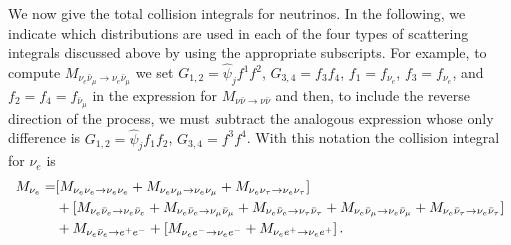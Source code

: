 We now give the total collision integrals for neutrinos.    In the following, we indicate which distributions are used in each of the four types of scattering integrals discussed above by using the appropriate subscripts. For example, to compute $M_{\nu_e\bar\nu_\mu\rightarrow\nu_e\bar\nu_\mu}$  we set $G_{1,2}=\hat\psi_jf^1f^2$, $G_{3,4}=f_3f_4$, $f_1= f_{\nu_e}$, $f_3=f_{\nu_e}$, and $f_2=f_4=f_{\bar\nu_\mu}$ in the expression  for $M_{\nu\bar\nu\rightarrow\nu\bar\nu}$  and then, to include the reverse direction of the process, we must {\emph subtract}  the analogous expression whose only difference is $G_{1,2}=\hat\psi_jf_1f_2$, $G_{3,4}=f^3f^4$.
With this notation the collision integral for $\nu_e$ is
\begin{align}\label{Mtot}
M_{\nu_e}=&[M_{\nu_e\nu_e\rightarrow\nu_e\nu_e}+M_{\nu_e\nu_\mu\rightarrow\nu_e\nu_\mu}+M_{\nu_e\nu_\tau\rightarrow\nu_e\nu_\tau}]\\
&+[M_{\nu_e\bar\nu_e\rightarrow\nu_e\bar\nu_e}+M_{\nu_e\bar\nu_e\rightarrow\nu_\mu\bar\nu_\mu}+M_{\nu_e\bar\nu_e\rightarrow\nu_\tau\bar\nu_\tau}+M_{\nu_e\bar\nu_\mu\rightarrow\nu_e\bar\nu_\mu}+M_{\nu_e\bar\nu_\tau\rightarrow\nu_e\bar\nu_\tau}]\notag\\
&+M_{\nu_e\bar\nu_e\rightarrow e^+e^-}+[M_{\nu_e e^-\rightarrow\nu_e e^-}+M_{\nu_e e^+\rightarrow\nu_e e^+}]\,.\notag
\end{align}



